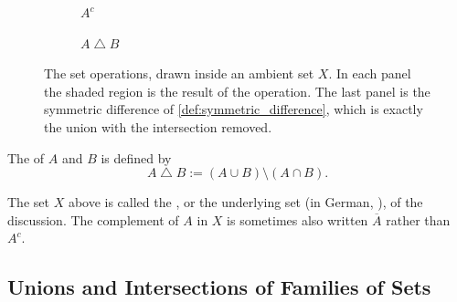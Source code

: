 \begin{figure}[ht!]
\begin{subfigure}[b]{0.19\textwidth}
    \centering
    \caption{$A^c$}
    \label{fig:venn_set_complement}
  \end{subfigure}%
  \hfill%
  \begin{subfigure}[b]{0.19\textwidth}
    \centering
    \caption{$A \bigtriangleup B$}
    \label{fig:venn_set_symdiff}
  \end{subfigure}
  \caption{The set operations, drawn inside an ambient set $X$. In each panel the shaded region is the result of the operation. The last panel is the symmetric difference of \cref{def:symmetric_difference}, which is exactly the union with the intersection removed.}
  \label{fig:set_operations}
\end{figure}

\begin{definition}
\label{def:symmetric_difference}
The  of $A$ and $B$ is defined by
\[
A \bigtriangleup B := (A \cup B) \setminus (A \cap B).
\]
\end{definition}

\begin{notation}
The set $X$ above is called the , or the underlying set (in German, ), of the discussion. The complement of $A$ in $X$ is sometimes also written $\overline{A}$ rather than $A^c$.
\end{notation}

\subsection{Unions and Intersections of Families of Sets}

